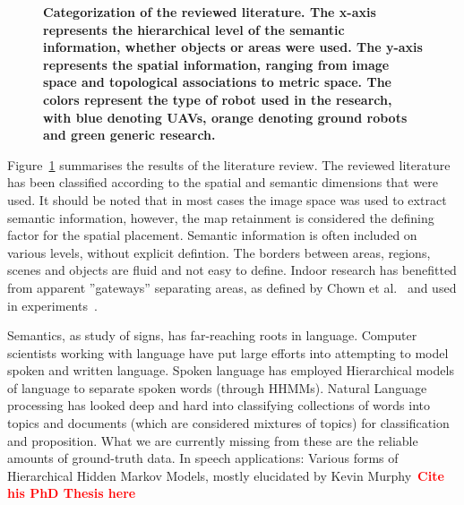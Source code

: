 \documentclass[twocolumn,letterpaper]{IEEEAerospaceCLS}  %
\newcommand\todo[1]{\textbf{\textcolor{red}{#1}}}
\begin{document}
\begin{figure}
    \centering
    \caption{\bf{
        Categorization of the reviewed literature. The x-axis represents the hierarchical level of the semantic information, whether objects or areas were used. The y-axis represents the spatial information, ranging from image space and topological associations to metric space. The colors represent the type of robot used in the research, with blue denoting UAVs, orange denoting ground robots and green generic research.
    }}
    \label{fig:LitRes}
\end{figure}
Figure~\ref{fig:LitRes} summarises the results of the literature review. The reviewed literature has been classified according to the spatial and semantic dimensions that were used. It should be noted that in most cases the image space was used to extract semantic information, however, the map retainment is considered the defining factor for the spatial placement. Semantic information is often included on various levels, without explicit defintion. The borders between areas, regions, scenes and objects are fluid and not easy to define. Indoor research has benefitted from apparent ''gateways'' separating areas, as defined by Chown et al.~\cite{chown_prototypes_1995} and used in experiments~\cite{krishnan_visual_2010,kuipers_local_2004,wu_learning_2018}.

Semantics, as study of signs, has far-reaching roots in language. Computer scientists working with language have put large efforts into attempting to model spoken and written language. Spoken language has employed Hierarchical models of language to separate spoken words (through HHMMs). Natural Language processing has looked deep and hard into classifying collections of words into topics and documents (which are considered mixtures of topics) for classification and proposition.
What we are currently missing from these are the reliable amounts of ground-truth data.
In speech applications: Various forms of Hierarchical Hidden Markov Models, mostly elucidated by Kevin Murphy~\todo{Cite his PhD Thesis here}
\end{document}
